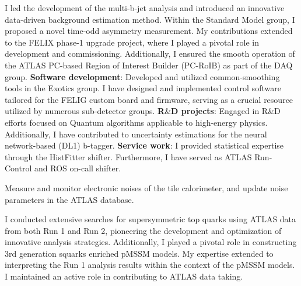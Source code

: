  \begin{cventries}   
  \end{cventries}
  \vspace{-1cm}
   \parbox{0.9\linewidth}{
      \leftskip=0.5in
       I led the development of the multi-b-jet analysis and introduced an innovative data-driven 
       background estimation method. Within the Standard Model group, I proposed a novel time-odd
       asymmetry measurement. My contributions extended to the FELIX phase-1 upgrade project, where
       I played a pivotal role in development and commissioning. Additionally, I ensured the smooth
       operation of the ATLAS PC-based Region of Interest Builder (PC-RoIB) as part of the DAQ group. \newline
        \textbf{Software development}: Developed and utilized common-smoothing tools in the Exotics group.
        I have designed and implemented control software tailored for the FELIG custom board and firmware,
        serving as a crucial resource utilized by numerous sub-detector groups. \newline
        \textbf{R$\&$D projects}: Engaged in R&D efforts focused on Quantum algorithms applicable to high-energy physics.
        Additionally, I have contributed to uncertainty estimations for the neural network-based (DL1) b-tagger. \newline
        \textbf{Service work}: I provided statistical expertise through the HistFitter shifter. 
        Furthermore, I have served as  ATLAS Run-Control and ROS on-call shifter.
    }
    

\begin{cventries}
\end{cventries}
    \vspace{-1cm}
    \parbox{0.9\linewidth}{
      \leftskip=0.5in
        Measure and monitor electronic noises of the tile calorimeter, and update noise parameters in the  ATLAS database.
    }
\begin{cventries}
\end{cventries}
    \vspace{-1cm}
     \parbox{0.9\linewidth}{
      \leftskip=0.5in
        I conducted extensive searches for supersymmetric top quarks using ATLAS data 
        from both Run 1 and Run 2, pioneering the development and optimization of innovative
        analysis strategies. Additionally, I played a pivotal role in constructing 
        3rd generation squarks enriched pMSSM models. My expertise extended to interpreting
        the Run 1 analysis results within the context of the pMSSM models. I maintained an active
        role in contributing to ATLAS data taking.

      }
